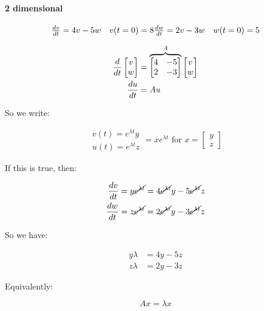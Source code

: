 \paragraph{2 dimensional}

\[
  \begin{matrix}
    {dv \over dt} = 4v - 5w & v(t=0) = 8
    {dw \over dt} = 2v - 3w & w(t=0) = 5
  \end{matrix}
\]

\begin{align*}
  {d \over dt} \begin{bmatrix}
    v \\ w
  \end{bmatrix}
  &=
  \overbrace{
    \begin{bmatrix}
      4 & -5 \\
      2 & -3
    \end{bmatrix}
  }^A
  \begin{bmatrix}
    v \\ w
  \end{bmatrix} \\
  {du \over dt} &= Au
\end{align*}

So we write:

\[
  \begin{matrix}
    v(t) = e^{\lambda t} y \\
    u(t) = e^{\lambda t} z
  \end{matrix}
   = x e^{\lambda t} \text{ for } x = 
  \begin{bmatrix}
    y \\ z
  \end{bmatrix}
\]

If this is true, then:

\begin{align*}
  {dv \over dt} &= y \cancel{e^{\lambda t}} = 4 \cancel{e^{\lambda t}}y - 5 \cancel{e^{\lambda t}} z \\
  {dw \over dt} &= z \cancel{e^{\lambda t}} = 2\cancel{e^{\lambda t}}y - 3 \cancel{e^{\lambda t}} z \\
\end{align*}

So we have:

\begin{align*}
  y \lambda &= 4y - 5z \\
  z \lambda &= 2y - 3z
\end{align*}

Equivalently:

\[
  Ax = \lambda x
\]

